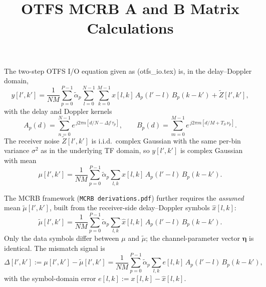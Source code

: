 \documentclass[11pt]{article}
\title{OTFS MCRB A and B Matrix Calculations}
\author{}
\date{}
\begin{document}
\maketitle

The two-step OTFS I/O equation given as (otfs\_io.tex) is, in the delay--Doppler domain,
\begin{equation}
    y[l',k'] = \frac{1}{NM}\sum_{p=0}^{P-1} \tilde{\alpha}_p
               \sum_{l=0}^{N-1}\sum_{k=0}^{M-1} x[l,k]\,
               A_p(l'-l)\, B_p(k-k') + \tilde{Z}[l',k'],
\label{eq:OTFS_IO}
\end{equation}
with the delay and Doppler kernels
\begin{equation}
    A_p(d) = \sum_{n=0}^{N-1} e^{\,j2\pi n[d/N - \Delta f\,\tau_p]}, \qquad
    B_p(d) = \sum_{m=0}^{M-1} e^{\,j2\pi m[d/M + T_S\,\nu_p]}.
\end{equation}
The receiver noise \(\tilde{Z}[l',k']\) is i.i.d.\ complex Gaussian with the same per-bin variance \(\sigma^2\) as in the underlying TF domain, so \(y[l',k']\) is complex Gaussian with mean
\begin{equation}
    \mu[l',k'] = \frac{1}{NM}\sum_{p=0}^{P-1} \tilde{\alpha}_p \sum_{l,k} x[l,k]\, A_p(l'-l)\, B_p(k-k').
\end{equation}

The MCRB framework (\texttt{MCRB derivations.pdf}) further requires the \emph{assumed} mean \(\tilde{\mu}[l',k']\), built from the receiver-side delay--Doppler symbols \(\hat{x}[l,k]\):
\begin{equation}
    \tilde{\mu}[l',k'] = \frac{1}{NM}\sum_{p=0}^{P-1} \tilde{\alpha}_p \sum_{l,k} \hat{x}[l,k]\, A_p(l'-l)\, B_p(k-k').
\end{equation}
Only the data symbols differ between \(\mu\) and \(\tilde{\mu}\); the channel-parameter vector \(\bm{\eta}\) is identical. The mismatch signal is
\begin{equation}
    \Delta[l',k'] := \mu[l',k'] - \tilde{\mu}[l',k'] = \frac{1}{NM}\sum_{p=0}^{P-1} \tilde{\alpha}_p \sum_{l,k} e[l,k]\, A_p(l'-l)\, B_p(k-k'),
\end{equation}
with the symbol-domain error \(e[l,k] := x[l,k] - \hat{x}[l,k]\).
\end{document}
